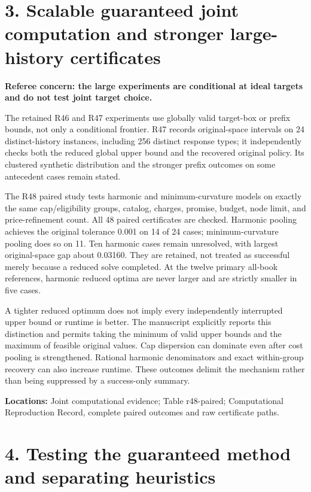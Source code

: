 \documentclass[11pt,letterpaper]{article}
\begin{document}
\section*{3. Scalable guaranteed joint computation and stronger large-history certificates}


\textbf{Referee concern: the large experiments are conditional at ideal targets and do not test joint target choice.}



The retained R46 and R47 experiments use globally valid target-box or prefix bounds, not only a conditional frontier. R47 records original-space intervals on 24 distinct-history instances, including 256 distinct response types; it independently checks both the reduced global upper bound and the recovered original policy. Its clustered synthetic distribution and the stronger prefix outcomes on some antecedent cases remain stated.



The R48 paired study tests harmonic and minimum-curvature models on exactly the same cap/eligibility groups, catalog, charges, promise, budget, node limit, and price-refinement count. All 48 paired certificates are checked. Harmonic pooling achieves the original tolerance 0.001 on 14 of 24 cases; minimum-curvature pooling does so on 11. Ten harmonic cases remain unresolved, with largest original-space gap about 0.03160. They are retained, not treated as successful merely because a reduced solve completed. At the twelve primary all-book references, harmonic reduced optima are never larger and are strictly smaller in five cases.



A tighter reduced optimum does not imply every independently interrupted upper bound or runtime is better. The manuscript explicitly reports this distinction and permits taking the minimum of valid upper bounds and the maximum of feasible original values. Cap dispersion can dominate even after cost pooling is strengthened. Rational harmonic denominators and exact within-group recovery can also increase runtime. These outcomes delimit the mechanism rather than being suppressed by a success-only summary.



\textbf{Locations:} Joint computational evidence; Table r48-paired; Computational Reproduction Record, complete paired outcomes and raw certificate paths.



\section*{4. Testing the guaranteed method and separating heuristics}
\end{document}
